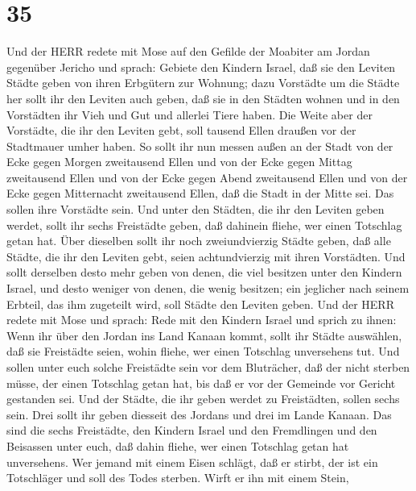 \hypertarget{section-34}{%
\section{35}\label{section-34}}

 Und der HERR redete mit Mose auf den Gefilde der Moabiter
am Jordan gegenüber Jericho und sprach:  Gebiete den Kindern
Israel, daß sie den Leviten Städte geben von ihren Erbgütern zur
Wohnung;  dazu Vorstädte um die Städte her sollt ihr den
Leviten auch geben, daß sie in den Städten wohnen und in den Vorstädten
ihr Vieh und Gut und allerlei Tiere haben.  Die Weite aber
der Vorstädte, die ihr den Leviten gebt, soll tausend Ellen draußen vor
der Stadtmauer umher haben.  So sollt ihr nun messen außen
an der Stadt von der Ecke gegen Morgen zweitausend Ellen und von der
Ecke gegen Mittag zweitausend Ellen und von der Ecke gegen Abend
zweitausend Ellen und von der Ecke gegen Mitternacht zweitausend Ellen,
daß die Stadt in der Mitte sei. Das sollen ihre Vorstädte sein.
 Und unter den Städten, die ihr den Leviten geben werdet,
sollt ihr sechs Freistädte geben, daß dahinein fliehe, wer einen
Totschlag getan hat. Über dieselben sollt ihr noch zweiundvierzig Städte
geben,  daß alle Städte, die ihr den Leviten gebt, seien
achtundvierzig mit ihren Vorstädten.  Und sollt derselben
desto mehr geben von denen, die viel besitzen unter den Kindern Israel,
und desto weniger von denen, die wenig besitzen; ein jeglicher nach
seinem Erbteil, das ihm zugeteilt wird, soll Städte den Leviten geben.
 Und der HERR redete mit Mose und sprach:  Rede
mit den Kindern Israel und sprich zu ihnen: Wenn ihr über den Jordan ins
Land Kanaan kommt,  sollt ihr Städte auswählen, daß sie
Freistädte seien, wohin fliehe, wer einen Totschlag unversehens tut.
 Und sollen unter euch solche Freistädte sein vor dem
Bluträcher, daß der nicht sterben müsse, der einen Totschlag getan hat,
bis daß er vor der Gemeinde vor Gericht gestanden sei.  Und
der Städte, die ihr geben werdet zu Freistädten, sollen sechs sein.
 Drei sollt ihr geben diesseit des Jordans und drei im
Lande Kanaan.  Das sind die sechs Freistädte, den Kindern
Israel und den Fremdlingen und den Beisassen unter euch, daß dahin
fliehe, wer einen Totschlag getan hat unversehens.  Wer
jemand mit einem Eisen schlägt, daß er stirbt, der ist ein Totschläger
und soll des Todes sterben.  Wirft er ihn mit einem Stein,
